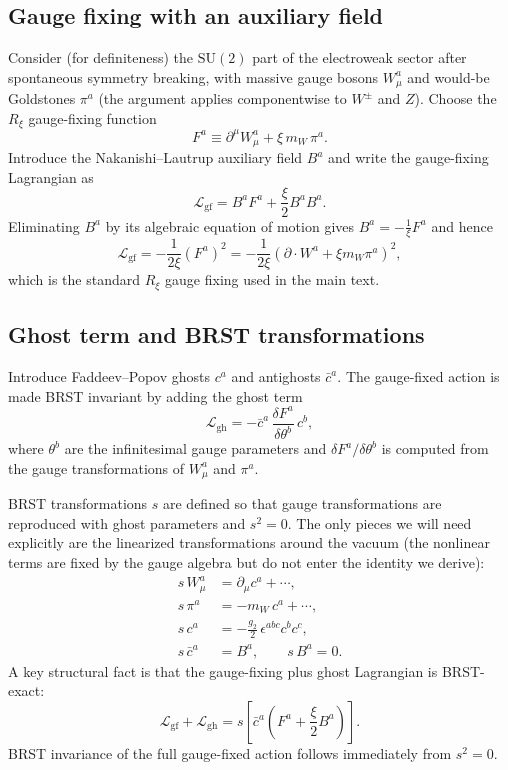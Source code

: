 \documentclass[11pt]{article}
\theoremstyle{remark}
\newcommand{\SU}{\ensuremath{\mathrm{SU}}}
\begin{document}
\subsection{Gauge fixing with an auxiliary field}
Consider (for definiteness) the $\SU(2)$ part of the electroweak sector after spontaneous symmetry
breaking, with massive gauge bosons $W_\mu^a$ and would-be Goldstones $\pi^a$ (the argument applies
componentwise to $W^\pm$ and $Z$).
Choose the $R_\xi$ gauge-fixing function
\begin{equation}\label{eq:LG-F}
F^a \equiv \partial^\mu W_\mu^a + \xi\,m_W\,\pi^a.
\end{equation}
Introduce the Nakanishi--Lautrup auxiliary field $B^a$ and write the gauge-fixing Lagrangian as
\begin{equation}\label{eq:LG-LgfB}
\mathcal{L}_{\mathrm{gf}} = B^a F^a + \frac{\xi}{2} B^a B^a.
\end{equation}
Eliminating $B^a$ by its algebraic equation of motion gives $B^a = -\frac{1}{\xi}F^a$ and hence
\begin{equation}\label{eq:LG-Lgf}
\mathcal{L}_{\mathrm{gf}} = -\frac{1}{2\xi}(F^a)^2
= -\frac{1}{2\xi}\left(\partial\!\cdot\! W^a + \xi m_W \pi^a\right)^2,
\end{equation}
which is the standard $R_\xi$ gauge fixing used in the main text.

\subsection{Ghost term and BRST transformations}
Introduce Faddeev--Popov ghosts $c^a$ and antighosts $\bar c^a$.
The gauge-fixed action is made BRST invariant by adding the ghost term
\begin{equation}\label{eq:LG-Lgh}
\mathcal{L}_{\mathrm{gh}} = -\bar c^a\,\frac{\delta F^a}{\delta\theta^b}\,c^b,
\end{equation}
where $\theta^b$ are the infinitesimal gauge parameters and $\delta F^a/\delta\theta^b$ is computed
from the gauge transformations of $W_\mu^a$ and $\pi^a$.

BRST transformations $s$ are defined so that gauge transformations are reproduced with ghost parameters
and $s^2=0$. The only pieces we will need explicitly are the linearized transformations around the
vacuum (the nonlinear terms are fixed by the gauge algebra but do not enter the identity we derive):
\begin{align}
s\,W_\mu^a &= \partial_\mu c^a + \cdots ,\label{eq:LG-sW}\\
s\,\pi^a &= -m_W\,c^a + \cdots ,\label{eq:LG-spi}\\
s\,c^a &= -\frac{g_2}{2}\,\epsilon^{abc}c^b c^c ,\label{eq:LG-sc}\\
s\,\bar c^a &= B^a,\qquad s\,B^a=0.\label{eq:LG-sbarc}
\end{align}
A key structural fact is that the gauge-fixing plus ghost Lagrangian is BRST-exact:
\begin{equation}\label{eq:LG-exact}
\mathcal{L}_{\mathrm{gf}}+\mathcal{L}_{\mathrm{gh}} = s\!\left[\bar c^a\left(F^a + \frac{\xi}{2}B^a\right)\right].
\end{equation}
BRST invariance of the full gauge-fixed action follows immediately from $s^2=0$.
\end{document}
